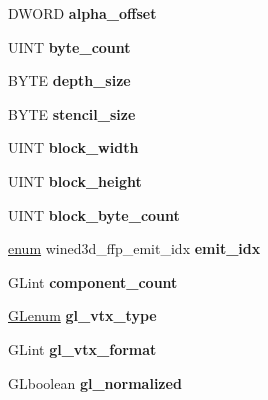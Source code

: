 \begin{DoxyCompactItemize}
D\+W\+O\+RD {\bfseries alpha\+\_\+offset}
\item 
\mbox{\label{structwined3d__format_aa4dc0882c01c8cd50e8fecfea0f7782c}} 
U\+I\+NT {\bfseries byte\+\_\+count}
\item 
\mbox{\label{structwined3d__format_a79f0b6315c1a01eefa140468b728bb39}} 
B\+Y\+TE {\bfseries depth\+\_\+size}
\item 
\mbox{\label{structwined3d__format_a41663479ca8041e5920a1109e60b3ccb}} 
B\+Y\+TE {\bfseries stencil\+\_\+size}
\item 
\mbox{\label{structwined3d__format_adce3ad62baeb2a496ea8569412f52a78}} 
U\+I\+NT {\bfseries block\+\_\+width}
\item 
\mbox{\label{structwined3d__format_aea818456eafcdeeead2cf7087463eab7}} 
U\+I\+NT {\bfseries block\+\_\+height}
\item 
\mbox{\label{structwined3d__format_a3f49493021702f1e5fd386d6f3967b2b}} 
U\+I\+NT {\bfseries block\+\_\+byte\+\_\+count}
\item 
\mbox{\label{structwined3d__format_a37da0f6b0d16f4c22c47af77fc937d3e}} 
\hyperlink{interfaceenum}{enum} wined3d\+\_\+ffp\+\_\+emit\+\_\+idx {\bfseries emit\+\_\+idx}
\item 
\mbox{\label{structwined3d__format_a6ac5da2ff80243a0b2842c4ac590fd11}} 
G\+Lint {\bfseries component\+\_\+count}
\item 
\mbox{\label{structwined3d__format_a360ed6c2c6f55d70af55376684a6516c}} 
\hyperlink{interfacevoid}{G\+Lenum} {\bfseries gl\+\_\+vtx\+\_\+type}
\item 
\mbox{\label{structwined3d__format_ad9f5ec6af02d8ba8b92d817a0b1d08a9}} 
G\+Lint {\bfseries gl\+\_\+vtx\+\_\+format}
\item 
\mbox{\label{structwined3d__format_a6e0a8415c93fe9909cb1a59cdfa13f34}} 
G\+Lboolean {\bfseries gl\+\_\+normalized}

\end{DoxyCompactItemize}
